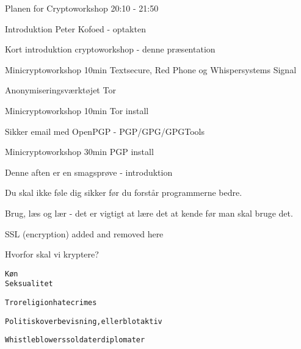 \documentclass[20pt,landscape,a4paper,footrule]{foils}
\begin{document}



Planen for Cryptoworkshop 20:10 - 21:50
\begin{list2}
\item Introduktion Peter Kofoed - optakten
\item Kort introduktion cryptoworkshop - denne præsentation
\item Minicryptoworkshop 10min Textsecure, Red Phone og Whispersystems Signal
\item Anonymiseringsværktøjet Tor
\item Minicryptoworkshop 10min Tor install
\item Sikker email med OpenPGP - PGP/GPG/GPGTools
\item Minicryptoworkshop 30min PGP install

\end{list2}




\begin{center}
Denne aften er en smagsprøve - introduktion

Du skal ikke føle dig sikker før du forstår programmerne bedre.

Brug, læs og lær - det er vigtigt at lære det at kende før man skal bruge det.
\end{center}



\centerline{SSL (encryption) added and removed here}




Hvorfor skal vi kryptere?

\begin{alltt}
       Køn
                       Seksualitet

 Tro religion       hatecrimes

 Politisk overbevisning, eller blot aktiv

 Whistleblowers             soldater      diplomater

\end{alltt}
\end{document}
